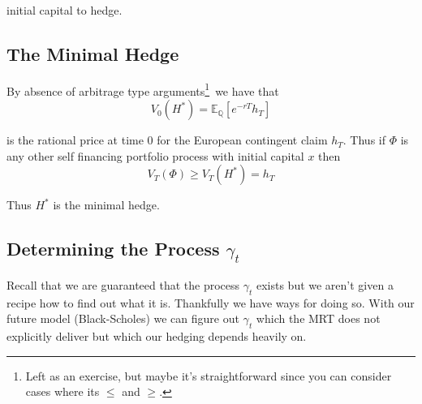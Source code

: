 \documentclass[12pt]{article}
\newlength\tindent
\renewcommand{\indent}{\hspace*{\tindent}}
\begin{document}
initial capital to hedge.

\subsection{The Minimal Hedge}

By absence of arbitrage type arguments\footnote{Left as an exercise, but maybe it's straightforward since you can consider cases where its $\leq$ and $\geq$.}~we have that
\begin{equation*}
	V_0(H^*) = \mathbb E_{\mathbb Q}[e^{-rT}h_T]
\end{equation*}

is the rational price at time 0 for the European contingent claim $h_T$. Thus if $\Phi$ is any other self financing portfolio process with initial capital $x$ then
\begin{equation*}
	V_T(\Phi) \geq V_T(H^*) = h_T
\end{equation*}

Thus $H^*$ is the minimal hedge.

\subsection{Determining the Process $\gamma_t$}

\indent Recall that we are guaranteed that the process $\gamma_t$ exists but we aren't given a recipe how to find out what it is. Thankfully we have ways for doing so. With our future model (Black-Scholes) we can figure out $\gamma_t$ which the MRT does not explicitly deliver but which our hedging depends heavily on.
\end{document}
